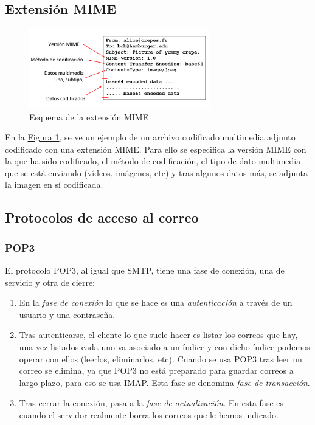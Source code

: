 \documentclass[10pt,a4paper,spanish]{report}
\begin{document}
\subsection{\textcolor{tema2}Extensión MIME}
\begin{figure}[!h]
\centering
\includegraphics[width=0.7\textwidth]{tema2_10}
\caption{Esquema de la extensión MIME}
\label{mime}
\end{figure}

En la \hyperref[mime]{Figura \ref*{mime}}, se ve un ejemplo de un archivo codificado multimedia adjunto codificado con una extensión MIME. Para ello se especifica la versión MIME con la que ha sido codificado, el método de codificación, el tipo de dato multimedia que se está enviando (vídeos, imágenes, etc) y tras algunos datos más, se adjunta la imagen en sí codificada.

\subsection{\textcolor{tema2}Protocolos de acceso al correo}
\subsubsection{\textcolor{tema2}POP3}
El protocolo POP3, al igual que SMTP, tiene una fase de conexión, una de servicio y otra de cierre:
\begin{enumerate}[\color{tema2}{$\flat$}]
  \item En la \textit{\textcolor{tema2}{fase de conexión}} lo que se hace es una \textit{\textcolor{tema2}{autenticación}} a través de un usuario y una contraseña.
  \item Tras autenticarse, el cliente lo que suele hacer es listar los correos que hay, una vez listados cada uno va asociado a un índice y con dicho índice podemos operar con ellos (leerlos, eliminarlos, etc). Cuando se usa POP3 tras leer un correo se elimina, ya que POP3 no está preparado para guardar correos a largo plazo, para eso se usa IMAP. Esta fase se denomina \textcolor{tema2}{\textit{fase de transacción}}.
  \item Tras cerrar la conexión, pasa a la \textit{\textcolor{tema2}{fase de actualización}}. En esta fase es cuando el servidor realmente borra los correos que le hemos indicado.
\end{enumerate}
\end{document}
